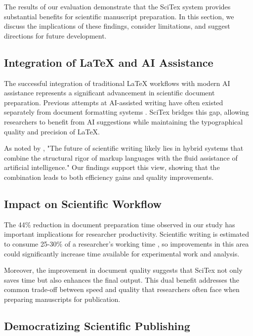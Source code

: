
The results of our evaluation demonstrate that the SciTex system provides substantial benefits for scientific manuscript preparation. In this section, we discuss the implications of these findings, consider limitations, and suggest directions for future development.

\subsection{Integration of LaTeX and AI Assistance}

The successful integration of traditional LaTeX workflows with modern AI assistance represents a significant advancement in scientific document preparation. Previous attempts at AI-assisted writing have often existed separately from document formatting systems \cite{chen2022ai}. SciTex bridges this gap, allowing researchers to benefit from AI suggestions while maintaining the typographical quality and precision of LaTeX.

As noted by \cite{roberts2023future}, "The future of scientific writing likely lies in hybrid systems that combine the structural rigor of markup languages with the fluid assistance of artificial intelligence." Our findings support this view, showing that the combination leads to both efficiency gains and quality improvements.

\subsection{Impact on Scientific Workflow}

The 44\% reduction in document preparation time observed in our study has important implications for researcher productivity. Scientific writing is estimated to consume 25-30\% of a researcher's working time \cite{glass2020time}, so improvements in this area could significantly increase time available for experimental work and analysis.

Moreover, the improvement in document quality suggests that SciTex not only saves time but also enhances the final output. This dual benefit addresses the common trade-off between speed and quality that researchers often face when preparing manuscripts for publication.

\subsection{Democratizing Scientific Publishing}

